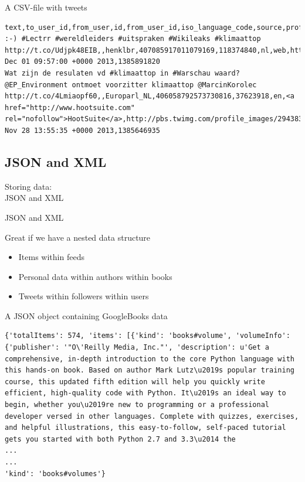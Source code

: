 \documentclass{beamer}
\begin{document}
{\begin{frame}[fragile]{A CSV-file with tweets}
\begin{lstlisting}
text,to_user_id,from_user,id,from_user_id,iso_language_code,source,profile_image_url,geo_type,geo_coordinates_0,geo_coordinates_1,created_at,time
:-) #Lectrr #wereldleiders #uitspraken #Wikileaks #klimaattop http://t.co/Udjpk48EIB,,henklbr,407085917011079169,118374840,nl,web,http://pbs.twimg.com/profile_images/378800000673845195/b47785b1595e6a1c63b93e463f3d0ccc_normal.jpeg,,0,0,Sun Dec 01 09:57:00 +0000 2013,1385891820
Wat zijn de resulaten vd #klimaattop in #Warschau waard? @EP_Environment ontmoet voorzitter klimaattop @MarcinKorolec http://t.co/4Lmiaopf60,,Europarl_NL,406058792573730816,37623918,en,<a href="http://www.hootsuite.com" rel="nofollow">HootSuite</a>,http://pbs.twimg.com/profile_images/2943831271/b6631b23a86502fae808ca3efde23d0d_normal.png,,0,0,Thu Nov 28 13:55:35 +0000 2013,1385646935\end{lstlisting}
\end{frame}



\subsection{JSON and XML}
\begin{frame}
Storing data:\\
JSON and XML
\end{frame}

\begin{frame}{JSON and XML}
\begin{block}{Great if we have a nested data structure}
\begin{itemize}
\item<2-> Items within feeds
\item<3-> Personal data within authors within books
\item<4-> Tweets within followers within users
\end{itemize}
\end{block}
\end{frame}


\begin{frame}[fragile]{A JSON object containing GoogleBooks data}
\begin{lstlisting}
{'totalItems': 574, 'items': [{'kind': 'books#volume', 'volumeInfo': {'publisher': '"O\'Reilly Media, Inc."', 'description': u'Get a comprehensive, in-depth introduction to the core Python language with this hands-on book. Based on author Mark Lutz\u2019s popular training course, this updated fifth edition will help you quickly write efficient, high-quality code with Python. It\u2019s an ideal way to begin, whether you\u2019re new to programming or a professional developer versed in other languages. Complete with quizzes, exercises, and helpful illustrations, this easy-to-follow, self-paced tutorial gets you started with both Python 2.7 and 3.3\u2014 the
...
...
'kind': 'books#volumes'}
\end{lstlisting}
\end{frame}

}
\end{document}
